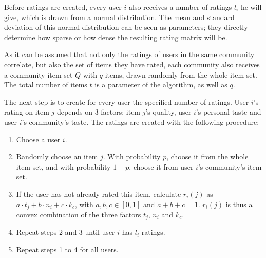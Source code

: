 Before ratings are created, every user $i$ also receives a number of ratings $l_i$ he will give, which is drawn from a normal distribution. The mean and standard deviation of this normal distribution can be seen as parameters; they directly determine how sparse or how dense the resulting rating matrix will be.

As it can be assumed that not only the ratings of users in the same community correlate, but also the set of items they have rated, each community also receives a community item set $Q$ with $q$ items, drawn randomly from the whole item set. The total number of items $t$ is a parameter of the algorithm, as well as $q$. 

The next step is to create for every user the specified number of ratings. User $i$'s rating on item $j$ depends on 3 factors: item $j$'s quality, user $i$'s personal taste and user $i$'s community's taste. The ratings are created with the following procedure:

\begin{enumerate}
\item Choose a user $i$.
\item Randomly choose an item $j$. With probability $p$, choose it from the whole item set, and with probability $1-p$, choose it from user $i$'s community's item set.
\item If the user has not already rated this item, calculate $r_i(j)$ as $a \cdot t_j + b \cdot n_i + c \cdot k_c$, with $a,b,c \in [0,1]$ and $a+b+c=1$. $r_i(j)$ is thus a convex combination of the three factors $t_j$, $n_i$ and $k_c$.
\item Repeat steps 2 and 3 until user $i$ has $l_i$ ratings.
\item Repeat steps 1 to 4 for all users.
\end{enumerate}